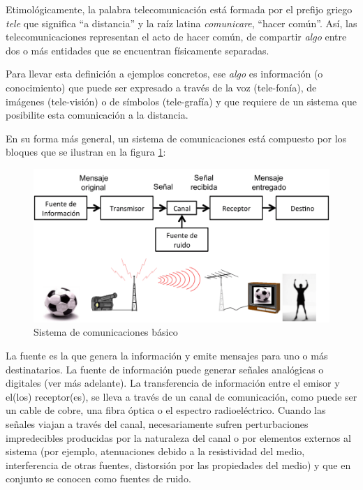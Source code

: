 \documentclass[
]{book}
\begin{document}
Etimológicamente, la palabra telecomunicación está formada por el prefijo griego \emph{tele} que significa ``a distancia'' y la raíz latina \emph{comunicare}, ``hacer común''. Así, las telecomunicaciones representan el acto de hacer común, de compartir \emph{algo} entre dos o más entidades que se encuentran físicamente separadas.

Para llevar esta definición a ejemplos concretos, ese \emph{algo} es información (o conocimiento) que puede ser expresado a través de la voz (tele-fonía), de imágenes (tele-visión) o de símbolos (tele-grafía) y que requiere de un sistema que posibilite esta comunicación a la distancia.

En su forma más general, un sistema de comunicaciones está compuesto por los bloques que se ilustran en la
figura \ref{fig:sistcom}:

\begin{figure}

{\centering \includegraphics{figuras/c1/sistcom-1} 

}

\caption{Sistema de comunicaciones básico}\label{fig:sistcom}
\end{figure}

La fuente es la que genera la información y emite mensajes para uno o más destinatarios. La fuente de información puede generar señales analógicas o digitales (ver más adelante). La transferencia de información entre el emisor y el(los) receptor(es), se lleva a través de un canal de comunicación, como puede ser un cable de cobre, una fibra óptica o el espectro radioeléctrico. Cuando las señales viajan a través del canal, necesariamente sufren perturbaciones impredecibles producidas por la naturaleza del canal o por elementos externos al sistema (por ejemplo, atenuaciones debido a la resistividad del medio, interferencia de otras fuentes, distorsión por las propiedades del medio) y que en conjunto se conocen como fuentes de ruido.
\end{document}
